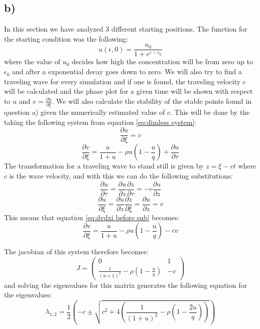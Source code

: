 \documentclass[15pt]{article}
\begin{document}
\subsection{b)}
In this section we have analyzed 3 different starting positions. The function for the starting condition was the following:
\begin{equation}
	u(\epsilon, 0) = \frac{u_0}{1 + e^{\epsilon - \epsilon_0}}
\end{equation}
where the value of $u_0$ decides how high the concentration will be from zero up to $\epsilon_0$ and after a exponential decay goes down to zero. We will also try to find a traveling wave for every simulation and if one is found, the traveling velocity $c$ will be calculated and the phase plot for a given time will be shown with respect to $u$ and $v = \frac{\partial u}{\partial \xi}$. We will also calculate the stability of the stable points found in question a) given the numerically estimated value of $c$. This will be done by the taking the following system from equation \ref{eq:dimless system}:
\begin{equation}
	\frac{\partial u}{\partial \xi} = v
\end{equation}
\begin{equation}
	\frac{\partial v}{\partial \xi} = \frac{u}{1+u} - \rho u (1-\frac{u}{q}) + \frac{\partial u}{\partial \tau}
	\label{eq:dvdxi before sub}
\end{equation}
The transformation for a traveling wave to stand still is given by $z = \xi - ct$ where $c$ is the wave velocity, and with this we can do the following substitutions:
\begin{equation}
	\frac{\partial u}{\partial \tau} = \frac{\partial u}{\partial z} \frac{\partial z}{\partial \tau} = -c\frac{\partial u}{\partial z}
\end{equation}
\begin{equation}
	\frac{\partial u}{\partial \xi} = \frac{\partial u}{\partial z} \frac{\partial z}{\partial \xi} = \frac{\partial u}{\partial z} = v
\end{equation}
This means that equation \ref{eq:dvdxi before sub} becomes:
\begin{equation}
	\frac{\partial v}{\partial \xi} = \frac{u}{1+u} - \rho u (1-\frac{u}{q}) -cv
\end{equation}

The jacobian of this system therefore becomes:
\begin{equation}
	J = \begin{pmatrix}
		0                                                   & 1  \\
		\frac{1}{(u+1)^2} - \rho\left(1- \frac{u}{q}\right) & -c
	\end{pmatrix}
\end{equation}
and solving the eigenvalues for this matrix generates the following equation for the eigenvalues:
\begin{equation}
	\lambda_{1,2} = \frac{1}{2}\left( -c \pm \sqrt{c^2 + 4 \left(\frac{1}{(1+u)^2} - \rho(1-\frac{2u}{q})\right)}\right)
	\label{eq:eigenvalues}
\end{equation}
\end{document}

